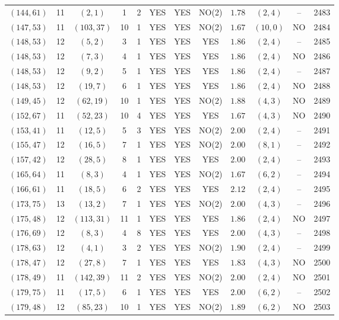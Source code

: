\begin{longtable}{|c|c|c|c|c|c|c|c|c|c|c|c|}
$(144,61)$ & 11 & $(2,1)$ & 1 & 2 & YES & YES & NO(2) & $1.78$ & $(2,4)$ & -- & 2483\\
$(147,53)$ & 11 & $(103,37)$ & 10 & 1 & YES & YES & NO(2) & $1.67$ & $(10,0)$ & NO & 2484\\
$(148,53)$ & 12 & $(5,2)$ & 3 & 1 & YES & YES & YES & $1.86$ & $(2,4)$ & -- & 2485\\
$(148,53)$ & 12 & $(7,3)$ & 4 & 1 & YES & YES & YES & $1.86$ & $(2,4)$ & NO & 2486\\
$(148,53)$ & 12 & $(9,2)$ & 5 & 1 & YES & YES & YES & $1.86$ & $(2,4)$ & -- & 2487\\
$(148,53)$ & 12 & $(19,7)$ & 6 & 1 & YES & YES & YES & $1.86$ & $(2,4)$ & NO & 2488\\
$(149,45)$ & 12 & $(62,19)$ & 10 & 1 & YES & YES & NO(2) & $1.88$ & $(4,3)$ & NO & 2489\\
$(152,67)$ & 11 & $(52,23)$ & 10 & 4 & YES & YES & YES & $1.67$ & $(4,3)$ & NO & 2490\\
$(153,41)$ & 11 & $(12,5)$ & 5 & 3 & YES & YES & NO(2) & $2.00$ & $(2,4)$ & -- & 2491\\
$(155,47)$ & 12 & $(16,5)$ & 7 & 1 & YES & YES & NO(2) & $2.00$ & $(8,1)$ & -- & 2492\\
$(157,42)$ & 12 & $(28,5)$ & 8 & 1 & YES & YES & YES & $2.00$ & $(2,4)$ & -- & 2493\\
$(165,64)$ & 11 & $(8,3)$ & 4 & 1 & YES & YES & NO(2) & $1.67$ & $(6,2)$ & -- & 2494\\
$(166,61)$ & 11 & $(18,5)$ & 6 & 2 & YES & YES & YES & $2.12$ & $(2,4)$ & -- & 2495\\
$(173,75)$ & 13 & $(13,2)$ & 7 & 1 & YES & YES & NO(2) & $2.00$ & $(4,3)$ & -- & 2496\\
$(175,48)$ & 12 & $(113,31)$ & 11 & 1 & YES & YES & YES & $1.86$ & $(2,4)$ & NO & 2497\\
$(176,69)$ & 12 & $(8,3)$ & 4 & 8 & YES & YES & YES & $2.00$ & $(4,3)$ & -- & 2498\\
$(178,63)$ & 12 & $(4,1)$ & 3 & 2 & YES & YES & NO(2) & $1.90$ & $(2,4)$ & -- & 2499\\
$(178,47)$ & 12 & $(27,8)$ & 7 & 1 & YES & YES & YES & $1.83$ & $(4,3)$ & NO & 2500\\
$(178,49)$ & 11 & $(142,39)$ & 11 & 2 & YES & YES & NO(2) & $2.00$ & $(2,4)$ & NO & 2501\\
$(179,75)$ & 11 & $(17,5)$ & 6 & 1 & YES & YES & YES & $2.00$ & $(6,2)$ & -- & 2502\\
$(179,48)$ & 12 & $(85,23)$ & 10 & 1 & YES & YES & NO(2) & $1.89$ & $(6,2)$ & NO & 2503\\

\end{longtable}

